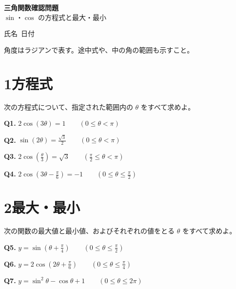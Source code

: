 \documentclass[a4paper,11pt]{ltjsarticle}
\begin{document}
\begin{center}
  {\LARGE\bfseries 三角関数\quad 確認問題}\\[2mm]
  {\normalsize $\sin$・$\cos$ の方程式と最大・最小}
\end{center}
\vspace{3mm}
\hfill 氏名\ \underline{\hspace{48mm}}\qquad 日付\ \underline{\hspace{27mm}}
\vspace{4mm}

角度はラジアンで表す。途中式や、中の角の範囲も示すこと。

\section*{1\quad 方程式}
次の方程式について、指定された範囲内の $\theta$ をすべて求めよ。
\begin{list}{}{\setlength{\leftmargin}{14mm}\setlength{\itemsep}{8mm}\setlength{\topsep}{3mm}}
  \item[\textbf{Q1.}] $\displaystyle 2\cos(3\theta)=1
    \qquad\left(0\leq\theta<\pi\right)$
  \item[\textbf{Q2.}] $\displaystyle \sin(2\theta)=\frac{\sqrt{3}}{2}
    \qquad\left(0\leq\theta<\pi\right)$
  \item[\textbf{Q3.}] $\displaystyle 2\cos\left(\frac{\theta}{3}\right)=\sqrt{3}
    \qquad\left(\frac{\pi}{2}\leq\theta<\pi\right)$
  \item[\textbf{Q4.}] $\displaystyle 2\cos\left(3\theta-\frac{\pi}{6}\right)=-1
    \qquad\left(0\leq\theta\leq\frac{\pi}{2}\right)$
\end{list}

\vspace{3mm}
\section*{2\quad 最大・最小}
次の関数の最大値と最小値、およびそれぞれの値をとる $\theta$ をすべて求めよ。
\begin{list}{}{\setlength{\leftmargin}{14mm}\setlength{\itemsep}{10mm}\setlength{\topsep}{4mm}}
  \item[\textbf{Q5.}] $\displaystyle y=\sin\left(\theta+\frac{\pi}{4}\right)
    \qquad\left(0\leq\theta\leq\frac{\pi}{2}\right)$
  \item[\textbf{Q6.}] $\displaystyle y=2\cos\left(2\theta+\frac{\pi}{6}\right)
    \qquad\left(0\leq\theta\leq\frac{\pi}{4}\right)$
  \item[\textbf{Q7.}] $\displaystyle y=\sin^2\theta-\cos\theta+1
    \qquad\left(0\leq\theta\leq2\pi\right)$
\end{list}
\end{document}
